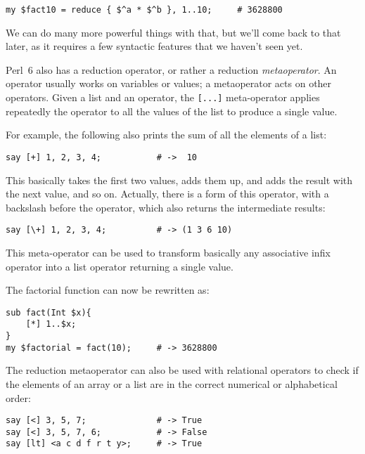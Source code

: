 \begin{verbatim}
my $fact10 = reduce { $^a * $^b }, 1..10;     # 3628800
\end{verbatim}
%

We can do many more powerful things with that, but we'll come 
back to that later, as it requires a few syntactic features that 
we haven't seen yet. 

Perl~6 also has a reduction operator, 
or rather a reduction \emph{metaoperator}. An operator 
usually works on variables or values; a metaoperator acts 
on other operators. Given a list and an operator, the 
\verb'[...]' meta-operator applies repeatedly the operator 
to all the values of the list to produce a single value.

For example, the following also prints the sum of all the 
elements of a list:

\begin{verbatim}
say [+] 1, 2, 3, 4;           # ->  10
\end{verbatim}

This basically takes the first two values, adds them up, and adds the result with the next value, and so on. Actually, 
there is a form of this operator, with a backslash before 
the operator, which also returns the intermediate results:

\begin{verbatim}
say [\+] 1, 2, 3, 4;          # -> (1 3 6 10)
\end{verbatim}

This meta-operator can be used to transform basically any 
associative infix operator into a list operator returning 
a single value.

The factorial function can now be rewritten as:

\begin{verbatim}
sub fact(Int $x){
    [*] 1..$x; 
}
my $factorial = fact(10);     # -> 3628800
\end{verbatim}

The reduction metaoperator can also be used with relational operators 
to check if the elements of an array or a list are in the 
correct numerical or alphabetical order:

\begin{verbatim}
say [<] 3, 5, 7;              # -> True
say [<] 3, 5, 7, 6;           # -> False
say [lt] <a c d f r t y>;     # -> True
\end{verbatim}

